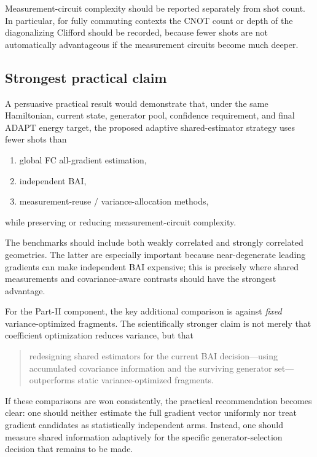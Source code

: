 \documentclass[11pt]{article}
\begin{document}
Measurement-circuit complexity should be reported separately from shot count.  In particular, for fully commuting contexts the CNOT count or depth of the diagonalizing Clifford should be recorded, because fewer shots are not automatically advantageous if the measurement circuits become much deeper.

\subsection{Strongest practical claim}

A persuasive practical result would demonstrate that, under the same Hamiltonian, current state, generator pool, confidence requirement, and final ADAPT energy target, the proposed adaptive shared-estimator strategy uses fewer shots than
\begin{enumerate}[leftmargin=2.2em]
    \item global FC all-gradient estimation,
    \item independent BAI,
    \item measurement-reuse / variance-allocation methods,
\end{enumerate}
while preserving or reducing measurement-circuit complexity.

The benchmarks should include both weakly correlated and strongly correlated geometries.  The latter are especially important because near-degenerate leading gradients can make independent BAI expensive; this is precisely where shared measurements and covariance-aware contrasts should have the strongest advantage.

For the Part-II component, the key additional comparison is against \emph{fixed} variance-optimized fragments.  The scientifically stronger claim is not merely that coefficient optimization reduces variance, but that
\begin{quote}
redesigning shared estimators for the current BAI decision---using accumulated covariance information and the surviving generator set---outperforms static variance-optimized fragments.
\end{quote}

If these comparisons are won consistently, the practical recommendation becomes clear: one should neither estimate the full gradient vector uniformly nor treat gradient candidates as statistically independent arms.  Instead, one should measure shared information adaptively for the specific generator-selection decision that remains to be made.
\end{document}
